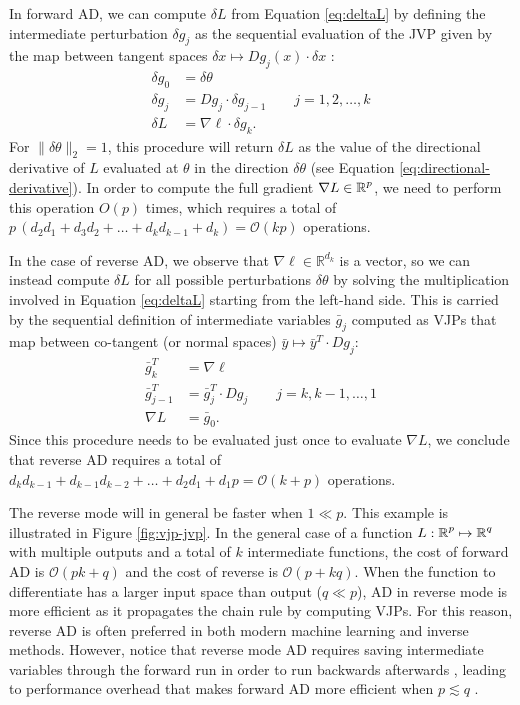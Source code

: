 In forward AD, we can compute $\delta L$ from Equation \eqref{eq:deltaL} by defining the intermediate perturbation $\delta g_j$ as the sequential evaluation of the JVP given by the map between tangent spaces $\delta x \mapsto Dg_j (x) \cdot \delta x$ \cite{Griewank:2008kh}:
\begin{align}
    \delta g_0 &= \delta \theta \\
    \delta g_j &= D g_j \cdot \delta g_{j-1} \qquad j = 1, 2, \ldots, k \\
    \delta L &= \nabla \ell \cdot \delta g_{k}.
\end{align}
For $\| \delta \theta \|_2 = 1$, this procedure will return $\delta L$ as the value of the directional derivative of $L$ evaluated at $\theta$ in the direction $\delta \theta$ (see Equation \eqref{eq:directional-derivative}). 
In order to compute the full gradient $\nabla L \in \operatorname{\mathbb{R}}^p$, we need to perform this operation $O(p)$ times, which requires a total of $p \, (d_2 d_1 + d_3 d_2 + \ldots + d_k d_{k-1} + d_k )= \mathcal O (kp)$ operations.

In the case of reverse AD, we observe that $\nabla \ell \in \mathbb R^{d_k}$ is a vector, so we can instead compute $\delta L$ for all possible perturbations $\delta \theta$ by solving the multiplication involved in Equation \eqref{eq:deltaL} starting from the left-hand side. 
This is carried by the sequential definition of intermediate variables $\bar g_j$ computed as VJPs that map between co-tangent (or normal spaces) $\bar y \mapsto \bar y^T \cdot Dg_j$:
\begin{align}
    \bar g_{k}^T &= \nabla \ell \\
    \bar g_{j-1}^T &= \bar g_{j}^T \cdot Dg_j \qquad j = k, k-1, \ldots, 1 \\
    \nabla L &= \bar g_0.
\end{align}
Since this procedure needs to be evaluated just once to evaluate $\nabla L$, we conclude that reverse AD requires a total of $ d_k d_{k-1} + d_{k-1} d_{k-2} + \ldots + d_2 d_1 + d_1 p = \mathcal O (k+p)$ operations. 

The reverse mode will in general be faster when $1 \ll p$. 
This example is illustrated in Figure \ref{fig:vjp-jvp}. 
In the general case of a function $L : \operatorname{\mathbb{R}}^p \mapsto \operatorname{\mathbb{R}}^q$ with multiple outputs and a total of $k$ intermediate functions, the cost of forward AD is $\mathcal O (pk + q)$ and the cost of reverse is $\mathcal O (p + kq)$.
When the function to differentiate has a larger input space than output ($q \ll p$), AD in reverse mode is more efficient as it propagates the chain rule by computing VJPs.
For this reason, reverse AD is often preferred in both modern machine learning and inverse methods.
However, notice that reverse mode AD requires saving intermediate variables through the forward run in order to run backwards afterwards \cite{Bennett_1973}, leading to performance overhead that makes forward AD more efficient when $p \lesssim q$ \cite{Griewank_1989, Margossian_2018, Baydin_Pearlmutter_Radul_Siskind_2015}. 

